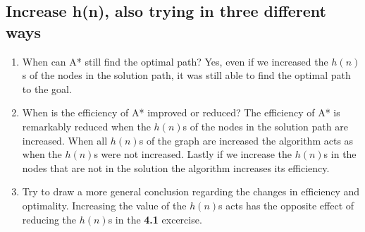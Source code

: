\documentclass{article}
\def\ans#1{{\color{ans}#1}}
\begin{document}
\subsection{Increase h(n), also trying in three different ways}
\begin{enumerate}[label=(\alph*)]
    \item When can A* still find the optimal path?
    \ans{
        Yes, even if we increased the $h(n)$s of the nodes in the solution path, it was still able 
        to find the optimal path to the goal.
    }
    \item When is the efficiency of A* improved or reduced? 
    \ans{
        The efficiency of A* is remarkably reduced when the $h(n)$s of the nodes in the solution path 
        are increased. When all $h(n)$s of the graph are increased the algorithm acts as when the $h(n)$s 
        were not increased. Lastly if we increase the $h(n)$s in the nodes that are not in the solution the 
        algorithm increases its efficiency.
    }
    \item Try to draw a more general conclusion regarding the changes in efficiency and optimality.
    \ans{
        Increasing the value of the $h(n)$s acts has the opposite effect of reducing the $h(n)$s in the 
        \textbf{4.1} excercise.
    }
\end{enumerate}
\end{document}
